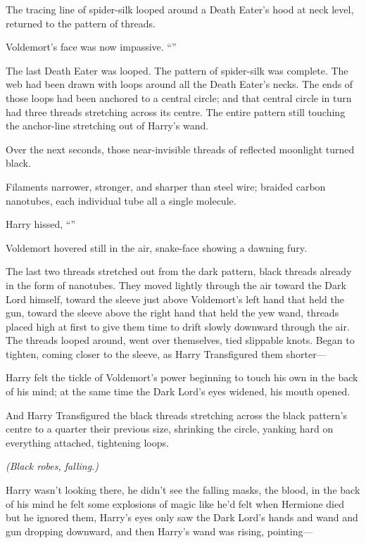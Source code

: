 The tracing line of spider-silk looped around a Death Eater’s hood at neck level, returned to the pattern of threads.

Voldemort’s face was now impassive. “”

The last Death Eater was looped. The pattern of spider-silk was complete. The web had been drawn with loops around all the Death Eater’s necks. The ends of those loops had been anchored to a central circle; and that central circle in turn had three threads stretching across its centre. The entire pattern still touching the anchor-line stretching out of Harry’s wand.

Over the next seconds, those near-invisible threads of reflected moonlight turned black.

Filaments narrower, stronger, and sharper than steel wire; braided carbon nanotubes, each individual tube all a single molecule.

Harry hissed, “”

Voldemort hovered still in the air, snake-face showing a dawning fury.

The last two threads stretched out from the dark pattern, black threads already in the form of nanotubes. They moved lightly through the air toward the Dark Lord himself, toward the sleeve just above Voldemort’s left hand that held the gun, toward the sleeve above the right hand that held the yew wand, threads placed high at first to give them time to drift slowly downward through the air. The threads looped around, went over themselves, tied slippable knots. Began to tighten, coming closer to the sleeve, as Harry Transfigured them shorter—

Harry felt the tickle of Voldemort’s power beginning to touch his own in the back of his mind; at the same time the Dark Lord’s eyes widened, his mouth opened.

And Harry Transfigured the black threads stretching across the black pattern’s centre to a quarter their previous size, shrinking the circle, yanking hard on everything attached, tightening loops.

\emph{(Black robes, falling.)}

Harry wasn’t looking there, he didn’t see the falling masks, the blood, in the back of his mind he felt some explosions of magic like he’d felt when Hermione died but he ignored them, Harry’s eyes only saw the Dark Lord’s hands and wand and gun dropping downward, and then Harry’s wand was rising, pointing—

